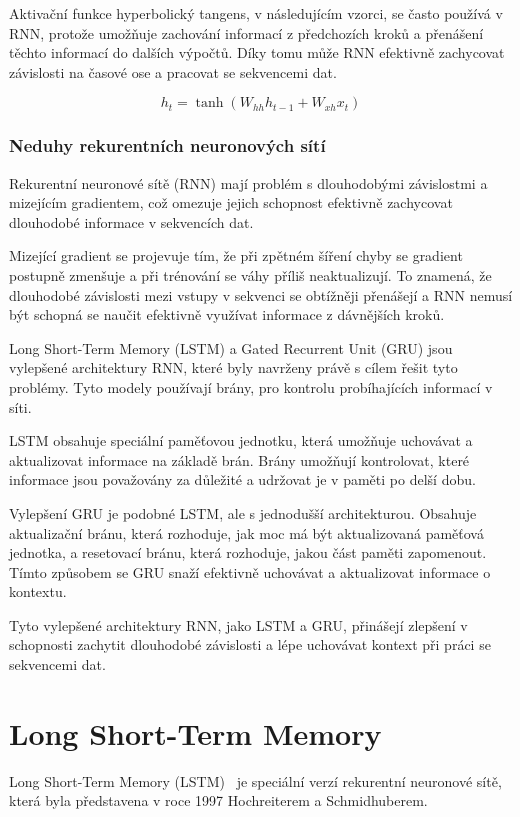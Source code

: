 Aktivační funkce hyperbolický tangens, v následujícím vzorci, se často používá v RNN, protože umožňuje zachování informací z předchozích kroků a přenášení těchto informací do dalších výpočtů.
Díky tomu může RNN efektivně zachycovat závislosti na časové ose a pracovat se sekvencemi dat.

\[h_{t} = \tanh(W_{hh} h_{t-1} + W_{xh} x_{t})\]

\subsubsection{Neduhy rekurentních neuronových sítí}
Rekurentní neuronové sítě (RNN) mají problém s dlouhodobými závislostmi a mizejícím gradientem, což omezuje jejich schopnost efektivně zachycovat dlouhodobé informace v sekvencích dat.

Mizející gradient se projevuje tím, že při zpětném šíření chyby se gradient postupně zmenšuje a při trénování se váhy příliš neaktualizují.
To znamená, že dlouhodobé závislosti mezi vstupy v sekvenci se obtížněji přenášejí a RNN nemusí být schopná se naučit efektivně využívat informace z dávnějších kroků.

Long Short-Term Memory (LSTM) a Gated Recurrent Unit (GRU) jsou vylepšené architektury RNN, které byly navrženy právě s cílem řešit tyto problémy.
Tyto modely používají brány, pro kontrolu probíhajících informací v síti.

LSTM obsahuje speciální paměťovou jednotku, která umožňuje uchovávat a aktualizovat informace na základě brán.
Brány umožňují kontrolovat, které informace jsou považovány za důležité a udržovat je v paměti po delší dobu.

Vylepšení GRU je podobné LSTM, ale s jednodušší architekturou.
Obsahuje aktualizační bránu, která rozhoduje, jak moc má být aktualizovaná paměťová jednotka, a resetovací bránu, která rozhoduje, jakou část paměti zapomenout.
Tímto způsobem se GRU snaží efektivně uchovávat a aktualizovat informace o kontextu.

Tyto vylepšené architektury RNN, jako LSTM a GRU, přinášejí zlepšení v schopnosti zachytit dlouhodobé závislosti a lépe uchovávat kontext při práci se sekvencemi dat.

\section{Long Short-Term Memory}
Long Short-Term Memory (LSTM)~\cite{link3} je speciální verzí rekurentní neuronové sítě, která byla představena v roce 1997 Hochreiterem a Schmidhuberem.

